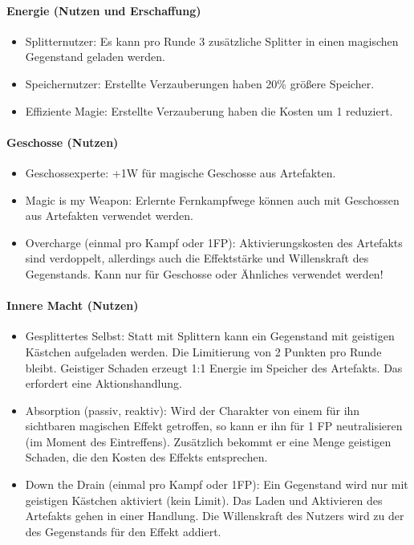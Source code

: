 \documentclass{article}
\begin{document}
\paragraph{Energie (Nutzen und Erschaffung)}

\begin{itemize}
\item Splitternutzer: Es kann pro Runde 3 zusätzliche Splitter in einen magischen Gegenstand geladen werden.
\item Speichernutzer: Erstellte Verzauberungen haben 20\% größere Speicher.
\item Effiziente Magie: Erstellte Verzauberung haben die Kosten um 1 reduziert.
\end{itemize}

\paragraph{Geschosse (Nutzen)}

\begin{itemize}
\item Geschossexperte: +1W für magische Geschosse aus Artefakten.
\item Magic is my Weapon: Erlernte Fernkampfwege können auch mit Geschossen aus Artefakten verwendet werden.
\item Overcharge (einmal pro Kampf oder 1FP): Aktivierungskosten des Artefakts sind verdoppelt, allerdings auch die Effektstärke und Willenskraft des Gegenstands. Kann nur für Geschosse oder Ähnliches verwendet werden!
\end{itemize}

\paragraph{Innere Macht (Nutzen)}

\begin{itemize}
\item Gesplittertes Selbst: Statt mit Splittern kann ein Gegenstand mit geistigen Kästchen aufgeladen werden. Die Limitierung von 2 Punkten pro Runde bleibt. Geistiger Schaden erzeugt 1:1 Energie im Speicher des Artefakts. Das erfordert eine Aktionshandlung.
\item Absorption (passiv, reaktiv): Wird der Charakter von einem für ihn sichtbaren magischen Effekt getroffen, so kann er ihn für 1 FP neutralisieren (im Moment des Eintreffens). Zusätzlich bekommt er eine Menge geistigen Schaden, die den Kosten des Effekts entsprechen.
\item Down the Drain (einmal pro Kampf oder 1FP): Ein Gegenstand wird nur mit geistigen Kästchen aktiviert (kein Limit). Das Laden und Aktivieren des Artefakts gehen in einer Handlung. Die Willenskraft des Nutzers wird zu der des Gegenstands für den Effekt addiert.
\end{itemize}
\end{document}
